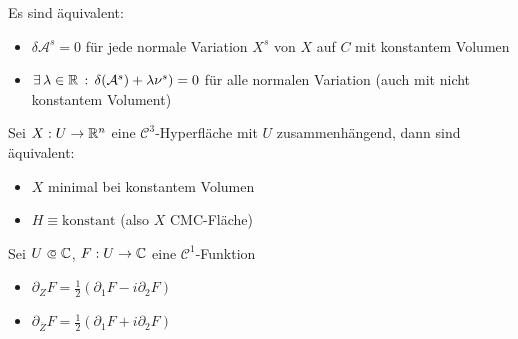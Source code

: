 \documentclass{cheat-sheet}
\begin{document}
\begin{prop}
  Es sind äquivalent:
  \begin{itemize}
    \item $\delta \mathcal{A}^s = 0$ für jede normale Variation $X^s$ von $X$ auf $C$ mit konstantem Volumen
    \item $\exists \, {\lambda \in \mathbb{R}} \,:\, \delta(\mathcal{A}^s) + \lambda \nu^s) = 0$ für alle normalen Variation (auch mit nicht konstantem Volument)
  \end{itemize}
\end{prop}


\begin{satz}
  Sei $X : U \to \mathbb{R}^n$ eine $\mathcal{C}^3$-Hyperfläche mit $U$ zusammenhängend, dann sind äquivalent:
  \begin{itemize}
    \item $X$ minimal bei konstantem Volumen
    \item $H \equiv \mathrm{konstant}$ (also $X$ CMC-Fläche)
  \end{itemize}
\end{satz}






Sei $U \opn \C$, $F : U \to \mathbb{C}$ eine $\mathcal{C}^1$-Funktion

\begin{nota}[Wirtinger]
  \begin{itemize}
    \item $\partial_{Z} F = \tfrac{1}{2} (\partial_1 F - i \partial_2 F)$
    \item $\partial_{\overline{Z}} F = \tfrac{1}{2} (\partial_1 F + i \partial_2 F)$
  \end{itemize}
\end{nota}
\end{document}
